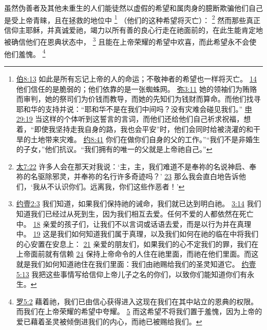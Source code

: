 \documentclass[12pt, a4paper, oneside]{ctexart}
\newcounter{parnum}[section]
\newcommand{\N}{%
   \noindent\refstepcounter{parnum}%
    \makebox[\parindent][l]{\textbf{\arabic{parnum}.}}}
\begin{document}
\N 虽然伪善者及其他未重生的人们能徒然以虚假的希望和属肉身的臆断欺骗他们自己是受上帝青睐，且在拯救的地位中
	\footnote {
		\href{https://biblehub.com/job/8-13.htm}{伯8:13} 如此是所有忘记上帝的人的命运；不敬神者的希望也一样将灭亡。
		\href{https://biblehub.com/job/8-14.htm}{14} 他们信任的是脆弱的；他们依靠的是一张蜘蛛网。
		\href{https://biblehub.com/micah/3-11.htm}{弥3:11} 她的领袖们为贿赂而审判，她的祭司们为价钱而教导，而她的先知们为钱财而算命。而他们找寻耶和华的支持并说：“耶和华不是在我们中间吗？没有灾难会碰见我们。”
		\href{https://biblehub.com/deuteronomy/29-19.htm}{申29:19} 当这样的个体听到这誓言的言词，而他们还给他们自己祈求祝福，想着，“即使我坚持走我自身的路，我也会平安”时，他们会同时给被浇灌的和干旱的土地带来灾难。
		\href{https://biblehub.com/john/8-41.htm}{约8:41} 你们在做你们自身的父的工作。”“我们不是非婚生的子女，”他们抗议。“我们拥有的唯一的父就是上帝祂自己。”
	}
	（他们的这种希望将灭亡）：
	\footnote {
		\href{https://biblehub.com/matthew/7-22.htm}{太7:22} 许多人会在那天对我说：‘主，主，我们难道不是奉祢的名说神启、奉祢的名驱除邪灵，并奉祢的名行许多奇迹吗？’
		\href{https://biblehub.com/matthew/7-23.htm}{23} 那么我会直白地告诉他们，‘我从不认识你们。远离我，你们这些作恶者！’
	}
	然而那些真正信仰主耶稣，并真诚爱祂，竭力以所有善的良心行走在祂面前的，在此生能肯定地被确信他们在恩典状态中，
	\footnote {
		\href{https://biblehub.com/1_john/2-3.htm}{约壹2:3} 我们知道，如果我们保持祂的诫命，我们就已达到明白祂。
		\href{https://biblehub.com/1_john/3-14.htm}{3:14} 我们知道我们已经过从死到生，因为我们相互去爱。任何不爱的人都依然在死亡中。
		\href{https://biblehub.com/1_john/3-18.htm}{18} 亲爱的孩子们，让我们不以言词或话语去爱，而是以行为并在真理中。
		\href{https://biblehub.com/1_john/3-19.htm}{19} 这是我们如何知道我们属于真理，以及我们如何在祂的临在中将我们的心安置在安息上：
		\href{https://biblehub.com/1_john/3-21.htm}{21} 亲爱的朋友们，如果我们的心不定我们的罪，我们在上帝面前就有信赖
		\href{https://biblehub.com/1_john/3-24.htm}{24} 保持上帝命令的人住在祂里面，而祂在他们里面。而这就是我们如何知道祂住在我们里面：我们由祂赐给我们的圣灵知道它。
		\href{https://biblehub.com/1_john/5-13.htm}{约壹5:13} 我把这些事情写给信仰上帝儿子之名的你们，以致你们能知道你们有永生。
	}
	且能在上帝荣耀的希望中欢喜，而此希望永不会使他们羞愧。
	\footnote {
		\href{https://biblehub.com/romans/5-2.htm}{罗5:2} 藉着祂，我们已由信心获得进入这现在我们在其中站立的恩典的权限。而我们在上帝荣耀的希望中夸耀。
		\href{https://biblehub.com/romans/5-5.htm}{5} 而这希望不将我们置于羞愧，因为上帝的爱已藉着圣灵被倾倒进我们的内心，而祂已被赐给我们。
	}
\end{document}
